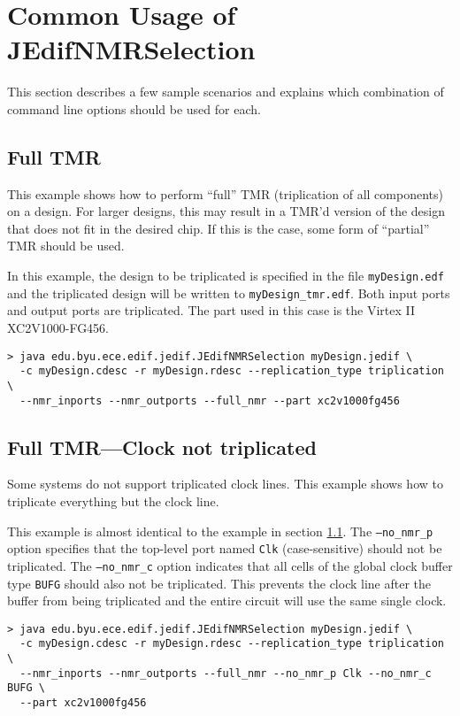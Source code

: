 \section{Common Usage of JEdifNMRSelection}
\label{sec:nmr_selection_examples}
This section describes a few sample scenarios and explains which combination of
command line options should be used for each.

\subsection{Full TMR}
\label{subsec:fulltmr}
This example shows how to perform ``full'' TMR (triplication of all components) 
on a design. For larger designs, this may result in a TMR'd version of the 
design that does not fit in the desired chip. If this is the case, some form of 
``partial'' TMR should be used.

In this example, the design to be triplicated is specified in the file 
\texttt{myDesign.edf} and the triplicated design will be written to 
\texttt{myDesign\_tmr.edf}. Both input ports and output ports are triplicated. 
The part used in this case is the Virtex II XC2V1000-FG456.

\begin{verbatim}
> java edu.byu.ece.edif.jedif.JEdifNMRSelection myDesign.jedif \
  -c myDesign.cdesc -r myDesign.rdesc --replication_type triplication \
  --nmr_inports --nmr_outports --full_nmr --part xc2v1000fg456
\end{verbatim}
\subsection{Full TMR---Clock not triplicated}
Some systems do not support triplicated clock lines. This example shows how to 
triplicate everything but the clock line.

This example is almost identical to the example in section 
\ref{subsec:fulltmr}. The \texttt{--no\_nmr\_p} option specifies that the 
top-level port named \texttt{Clk} (case-sensitive) should not be triplicated. 
The \texttt{--no\_nmr\_c} option indicates that all cells of the global clock 
buffer type \texttt{BUFG} should also not be triplicated. This prevents the 
clock line after the buffer from being triplicated and the entire circuit will 
use the same single clock.

\begin{verbatim}
> java edu.byu.ece.edif.jedif.JEdifNMRSelection myDesign.jedif \
  -c myDesign.cdesc -r myDesign.rdesc --replication_type triplication \
  --nmr_inports --nmr_outports --full_nmr --no_nmr_p Clk --no_nmr_c BUFG \
  --part xc2v1000fg456
\end{verbatim}


